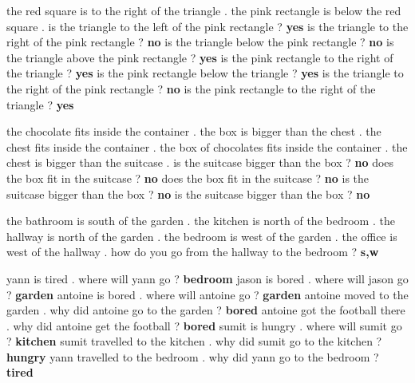 \begin{table}[htb!]
\begin{tcbraster}[raster columns=2, size=minimal, raster valign=top]
\begin{tcolorbox}[mybox, title=Task 17: Positional reasoning]
    \tiny
 the red square is to the right of the triangle . the pink rectangle is below the red square . is the triangle to the left of the pink rectangle ? \textbf{yes} is the triangle to the right of the pink rectangle ? \textbf{no} is the triangle below the pink rectangle ? \textbf{no} is the triangle above the pink rectangle ? \textbf{yes} is the pink rectangle to the right of the triangle ? \textbf{yes} is the pink rectangle below the triangle ? \textbf{yes} is the triangle to the right of the pink rectangle ? \textbf{no} is the pink rectangle to the right of the triangle ? \textbf{yes}
    \end{tcolorbox}  
    \begin{tcolorbox}[mybox, title=Task 18: Size reasoning] 
    \tiny
the chocolate fits inside the container . the box is bigger than the chest . the chest fits inside the container . the box of chocolates fits inside the container . the chest is bigger than the suitcase . is the suitcase bigger than the box ? \textbf{no} does the box fit in the suitcase ? \textbf{no} does the box fit in the suitcase ? \textbf{no} is the suitcase bigger than the box ? \textbf{no} is the suitcase bigger than the box ? \textbf{no}
    \end{tcolorbox}    
    \begin{tcolorbox}[mybox, title=Task 19: Path finding] 
    \tiny
the bathroom is south of the garden . the kitchen is north of the bedroom . the hallway is north of the garden . the bedroom is west of the garden . the office is west of the hallway . how do you go from the hallway to the bedroom ? \textbf{s,w}
    \end{tcolorbox}  
    \begin{tcolorbox}[mybox, title=Task 20: Agent's motivation] 
    \tiny
 yann is tired . where will yann go ? \textbf{bedroom} jason is bored . where will jason go ? \textbf{garden} antoine is bored . where will antoine go ? \textbf{garden} antoine moved to the garden . why did antoine go to the garden ? \textbf{bored} antoine got the football there . why did antoine get the football ? \textbf{bored} sumit is hungry . where will sumit go ? \textbf{kitchen} sumit travelled to the kitchen . why did sumit go to the kitchen ? \textbf{hungry} yann travelled to the bedroom . why did yann go to the bedroom ? \textbf{tired} 
    \end{tcolorbox}  
\end{tcbraster} 


\end{table}  

